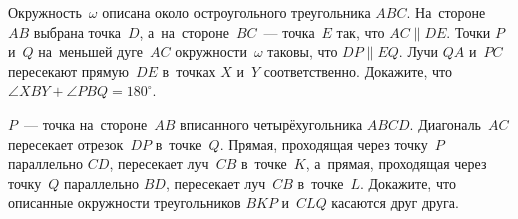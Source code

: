 \begin{problems}
\item
Окружность~$\omega$ описана около остроугольного треугольника $ABC$.
На~стороне~$AB$ выбрана точка~$D$, а~на~стороне~$BC$~--- точка~$E$ так, что
$AC \parallel DE$.
Точки $P$ и~$Q$ на~меньшей дуге~$AC$ окружности~$\omega$ таковы, что
$DP \parallel EQ$.
Лучи $QA$ и~$PC$ пересекают прямую~$DE$ в~точках $X$ и~$Y$ соответственно.
Докажите, что $\angle XBY + \angle PBQ = 180^{\circ}$.

\item
$P$~--- точка на~стороне~$AB$ вписанного четырёхугольника $ABCD$.
Диагональ~$AC$ пересекает отрезок~$DP$ в~точке~$Q$.
Прямая, проходящая через точку~$P$ параллельно $CD$, пересекает луч~$CB$
в~точке~$K$, а~прямая, проходящая через точку~$Q$ параллельно $BD$, пересекает
луч~$CB$ в~точке~$L$.
Докажите, что описанные окружности треугольников $BKP$ и~$CLQ$ касаются
друг друга.

\end{problems}

